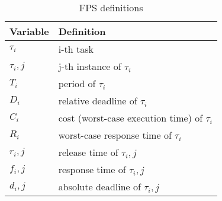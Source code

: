 \begin{table}[H]
\centering
\begin{tabular}{ll}
\textbf{Variable} & \textbf{Definition}                \\
\hline
$\tau_i$   & i-th task                                    \\
$\tau_i,j$ & j-th instance of $\tau_i$                    \\
$T_i$      & period of $\tau_i$                           \\
$D_i$      & relative deadline of $\tau_i$                \\
$C_i$      & cost (worst-case execution time) of $\tau_i$ \\
$R_i$      & worst-case response time of $\tau_i$         \\
$r_i,j$    & release time of $\tau_i,j$                   \\
$f_i,j$    & response time of $\tau_i,j$                  \\
$d_i,j$    & absolute deadline of $\tau_i,j$              \\     
\hline
\end{tabular}
\caption{FPS definitions}
\label{tab:FPSdef}
\end{table}